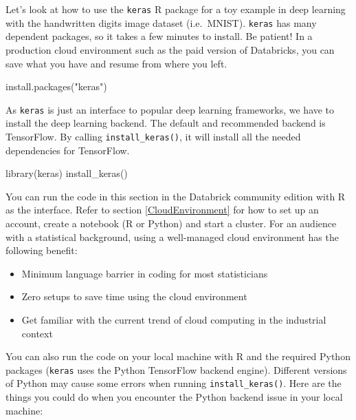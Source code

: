 \documentclass[
  12pt,
]{krantz}
\makeatletter
\newenvironment{Shaded}{\begin{snugshade}}{\end{snugshade}}
\newcommand{\FunctionTok}[1]{\textcolor[rgb]{0,0,0}{#1}}
\newcommand{\NormalTok}[1]{#1}
\newcommand{\StringTok}[1]{\textcolor[rgb]{0.5,0.5,0.5}{#1}}
\providecommand{\tightlist}{%
  \setlength{\itemsep}{0pt}\setlength{\parskip}{0pt}}
\newenvironment{kframe}{%
\medskip{}
\setlength{\fboxsep}{.8em}
 \def\at@end@of@kframe{}%
 \ifinner\ifhmode%
  \def\at@end@of@kframe{\end{minipage}}%
  \begin{minipage}{\columnwidth}%
 \fi\fi%
 \def\FrameCommand##1{\hskip\@totalleftmargin \hskip-\fboxsep
 \colorbox{shadecolor}{##1}\hskip-\fboxsep
     \hskip-\linewidth \hskip-\@totalleftmargin \hskip\columnwidth}%
 \MakeFramed {\advance\hsize-\width
   \@totalleftmargin\z@ \linewidth\hsize
   \@setminipage}}%
 {\par\unskip\endMakeFramed%
 \at@end@of@kframe}
\renewenvironment{Shaded}{\begin{kframe}}{\end{kframe}}
\makeatother
\begin{document}
Let's look at how to use the \texttt{keras} R package for a toy example in deep learning with the handwritten digits image dataset (i.e.~MNIST). \texttt{keras} has many dependent packages, so it takes a few minutes to install. Be patient! In a production cloud environment such as the paid version of Databricks, you can save what you have and resume from where you left.

\begin{Shaded}
\begin{Highlighting}[]
\FunctionTok{install.packages}\NormalTok{(}\StringTok{"keras"}\NormalTok{)}
\end{Highlighting}
\end{Shaded}

As \texttt{keras} is just an interface to popular deep learning frameworks, we have to install the deep learning backend. The default and recommended backend is TensorFlow. By calling \texttt{install\_keras()}, it will install all the needed dependencies for TensorFlow.

\begin{Shaded}
\begin{Highlighting}[]
\FunctionTok{library}\NormalTok{(keras)}
\FunctionTok{install\_keras}\NormalTok{()}
\end{Highlighting}
\end{Shaded}

You can run the code in this section in the Databrick community edition with R as the interface. Refer to section \ref{CloudEnvironment} for how to set up an account, create a notebook (R or Python) and start a cluster. For an audience with a statistical background, using a well-managed cloud environment has the following benefit:

\begin{itemize}
\tightlist
\item
  Minimum language barrier in coding for most statisticians
\item
  Zero setups to save time using the cloud environment
\item
  Get familiar with the current trend of cloud computing in the industrial context
\end{itemize}

You can also run the code on your local machine with R and the required Python packages (\texttt{keras} uses the Python TensorFlow backend engine). Different versions of Python may cause some errors when running \texttt{install\_keras()}. Here are the things you could do when you encounter the Python backend issue in your local machine:
\end{document}
